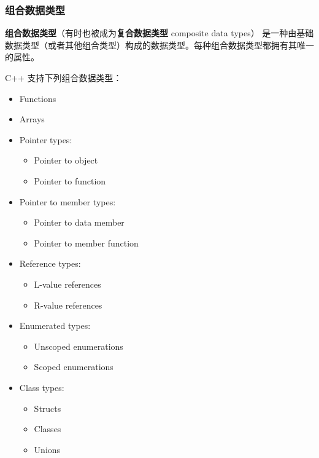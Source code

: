 \documentclass[../../LearnCpp.tex]{subfiles}
\begin{document}

\subsubsection*{组合数据类型}

\textbf{组合数据类型}（有时也被成为\textbf{复合数据类型} composite data types）
是一种由基础数据类型（或者其他组合类型）构成的数据类型。每种组合数据类型都拥有其唯一的属性。

C++ 支持下列组合数据类型：

\begin{itemize}
  \item Functions
  \item Arrays
  \item Pointer types: \begin{itemize}
          \item Pointer to object
          \item Pointer to function
        \end{itemize}
  \item Pointer to member types: \begin{itemize}
          \item Pointer to data member
          \item Pointer to member function
        \end{itemize}
  \item Reference types: \begin{itemize}
          \item L-value references
          \item R-value references
        \end{itemize}
  \item Enumerated types: \begin{itemize}
          \item Unscoped enumerations
          \item Scoped enumerations
        \end{itemize}
  \item Class types: \begin{itemize}
          \item Structs
          \item Classes
          \item Unions
        \end{itemize}
\end{itemize}
\end{document}
